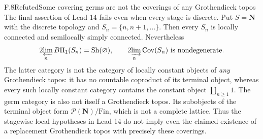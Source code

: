\begin{statement}{F.8}{Refuted}{Some covering germs are not the coverings of any Grothendieck topos}
The final assertion of Lead 14 fails even when every stage is
discrete. Put $S=\mathbf N$ with the discrete
topology and $S_n=\{n,n+1,\ldots\}$. Then every $S_n$ is locally
connected and semilocally simply connected. Nevertheless
\[
 \operatorname*{2\!\varprojlim}_n B\Pi_1(S_n)
       =\operatorname{Sh}(\varnothing),
 \qquad
 \operatorname*{2\!\varinjlim}_n\operatorname{Cov}(S_n)
       \text{ is nondegenerate}.
\]
The latter category is not the category of locally constant objects
of \emph{any} Grothendieck topos: it has no countable coproduct of
its terminal object, whereas every such locally constant category
contains the constant object $\coprod_{n\geq1}1$.
The germ category is also not itself a Grothendieck topos. Its subobjects
of the terminal object form $\mathcal P(\mathbf N)/\mathrm{Fin}$,
which is not a complete lattice. Thus the stagewise local hypotheses
in Lead 14 do not imply even the claimed existence of a replacement
Grothendieck topos with precisely these coverings.
\end{statement}
